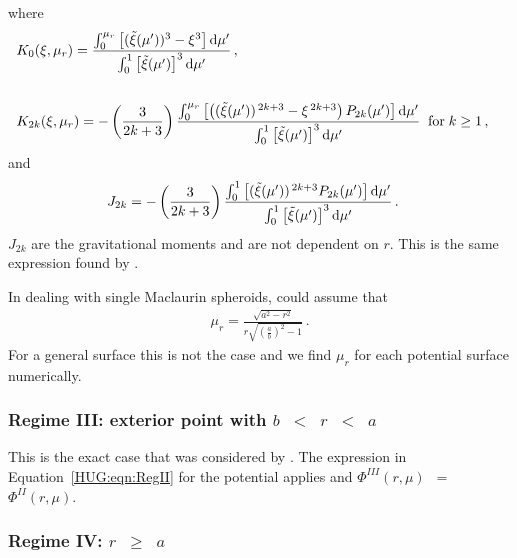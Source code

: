 \documentclass[11pt, oneside]{article}   	%
\begin{document}
%
where
%
\begin{align}
& \begin{aligned}
\label{HUG:eqn:1lay_K0} 
K_0(\xi,\mu_r)  {} &=   \frac{ \int_{0}^{\mu_r} \left [ (\tilde{\xi}(\mu'))^3 - \xi^3 \right ] {\rm d}\mu' }{\int_{0}^{1} \left [ \tilde{\xi}(\mu') \right ]^3 {\rm d}\mu' } \,,
\end{aligned} \\[4ex]
%
& \begin{aligned}
\label{HUG:eqn:1lay_K2k} 
K_{2k}(\xi,\mu_r) {} &= - \left ( \frac{3}{2k+3} \right ) \frac{ \int_{0}^{\mu_r} \left [ \left ( (\tilde{\xi}(\mu'))^{\, 2k+3} - \xi^{\, 2k+3} \right ) P_{2k}(\mu') \right ] {\rm d}\mu' }{\int_{0}^{1} \left [ \tilde{\xi}(\mu') \right ]^3 {\rm d}\mu' }  \;\; \textrm{for}\; k \ge 1 \, ,
\end{aligned} 
\end{align}
%
and
%
\begin{align}
\label{HUG:eqn:1lay_J2k} 
J_{2k}  {} &=  - \left ( \frac{3}{2k+3} \right ) \frac{ \int_{0}^{1} \left [ (\tilde{\xi}(\mu'))^{\, 2k+3}  P_{2k}(\mu') \right ] {\rm d}\mu' }{\int_{0}^{1} \left [ \tilde{\xi}(\mu') \right ]^3 {\rm d}\mu' } \,.
\end{align}
%
$J_{2k}$ are the gravitational moments and are not dependent on $r$.
This is the same expression found by \citet{Kong2013}.

In dealing with single Maclaurin spheroids, \citet{Kong2013} could assume that 
%
\begin{align}
\mu_r=\frac{\sqrt{a^2-r^2}}{r \sqrt{\left (\frac{a}{b} \right )^2 -1}} \,.
\end{align}
%
For a general surface this is not the case and we find $\mu_r$ for each potential surface numerically.

\subsubsection{Regime III: exterior point with $b$~$<$~$r$~$<$~$a$}
\label{HUG:sec:R3}

This is the exact case that was considered by \cite{Kong2013}.
The expression in Equation~\ref{HUG:eqn:RegII} for the potential applies and $\Phi^{III}(r,\mu)$~$=$~$\Phi^{II}(r,\mu)$.

\subsubsection{Regime IV: $r$~$\geq$~$a$}
\label{HUG:sec:R4}
\end{document}
